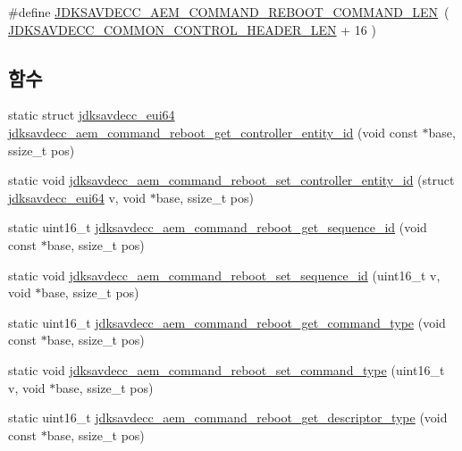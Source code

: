 \begin{DoxyCompactItemize}
\item 
\#define \hyperlink{group__command__reboot_gaf5f6dbe8949b2bb7db6ad9e25e8bddf1}{J\+D\+K\+S\+A\+V\+D\+E\+C\+C\+\_\+\+A\+E\+M\+\_\+\+C\+O\+M\+M\+A\+N\+D\+\_\+\+R\+E\+B\+O\+O\+T\+\_\+\+C\+O\+M\+M\+A\+N\+D\+\_\+\+L\+EN}~( \hyperlink{group__jdksavdecc__avtp__common__control__header_gaae84052886fb1bb42f3bc5f85b741dff}{J\+D\+K\+S\+A\+V\+D\+E\+C\+C\+\_\+\+C\+O\+M\+M\+O\+N\+\_\+\+C\+O\+N\+T\+R\+O\+L\+\_\+\+H\+E\+A\+D\+E\+R\+\_\+\+L\+EN} + 16 )
\end{DoxyCompactItemize}
\subsection*{함수}
\begin{DoxyCompactItemize}
\item 
static struct \hyperlink{structjdksavdecc__eui64}{jdksavdecc\+\_\+eui64} \hyperlink{group__command__reboot_ga1890ea4a161197f930ec73dfdc9cb61a}{jdksavdecc\+\_\+aem\+\_\+command\+\_\+reboot\+\_\+get\+\_\+controller\+\_\+entity\+\_\+id} (void const $\ast$base, ssize\+\_\+t pos)
\item 
static void \hyperlink{group__command__reboot_gaae7354b65b58a9189b5c7cf8646e0de2}{jdksavdecc\+\_\+aem\+\_\+command\+\_\+reboot\+\_\+set\+\_\+controller\+\_\+entity\+\_\+id} (struct \hyperlink{structjdksavdecc__eui64}{jdksavdecc\+\_\+eui64} v, void $\ast$base, ssize\+\_\+t pos)
\item 
static uint16\+\_\+t \hyperlink{group__command__reboot_gad4d61aa73f09dbd1f60af6ecb42a1127}{jdksavdecc\+\_\+aem\+\_\+command\+\_\+reboot\+\_\+get\+\_\+sequence\+\_\+id} (void const $\ast$base, ssize\+\_\+t pos)
\item 
static void \hyperlink{group__command__reboot_gae85bd5828d4c72c88511afadcb7f2158}{jdksavdecc\+\_\+aem\+\_\+command\+\_\+reboot\+\_\+set\+\_\+sequence\+\_\+id} (uint16\+\_\+t v, void $\ast$base, ssize\+\_\+t pos)
\item 
static uint16\+\_\+t \hyperlink{group__command__reboot_ga94f7c958d027c8b42beeff8f5d2d31ac}{jdksavdecc\+\_\+aem\+\_\+command\+\_\+reboot\+\_\+get\+\_\+command\+\_\+type} (void const $\ast$base, ssize\+\_\+t pos)
\item 
static void \hyperlink{group__command__reboot_gaa2b45262789de77d25ed2d9bf02809b5}{jdksavdecc\+\_\+aem\+\_\+command\+\_\+reboot\+\_\+set\+\_\+command\+\_\+type} (uint16\+\_\+t v, void $\ast$base, ssize\+\_\+t pos)
\item 
static uint16\+\_\+t \hyperlink{group__command__reboot_ga93d390a9dc9aac8dcacf02e949615f6c}{jdksavdecc\+\_\+aem\+\_\+command\+\_\+reboot\+\_\+get\+\_\+descriptor\+\_\+type} (void const $\ast$base, ssize\+\_\+t pos)

\end{DoxyCompactItemize}
